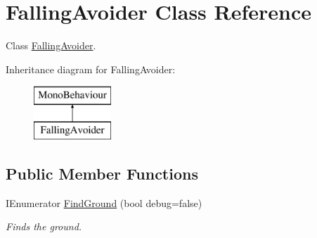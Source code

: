 \hypertarget{class_falling_avoider}{}\section{Falling\+Avoider Class Reference}
\label{class_falling_avoider}


Class \hyperlink{class_falling_avoider}{Falling\+Avoider}.  


Inheritance diagram for Falling\+Avoider\+:\begin{figure}[H]
\begin{center}
\leavevmode
\includegraphics[height=2.000000cm]{class_falling_avoider}
\end{center}
\end{figure}
\subsection*{Public Member Functions}
\begin{DoxyCompactItemize}
\item 
I\+Enumerator \hyperlink{class_falling_avoider_a732da8b6196fadb6c6f1a1b5d853c0c0}{Find\+Ground} (bool debug=false)
\begin{DoxyCompactList}\small\item\em Finds the ground. \end{DoxyCompactList}\end{DoxyCompactItemize}
